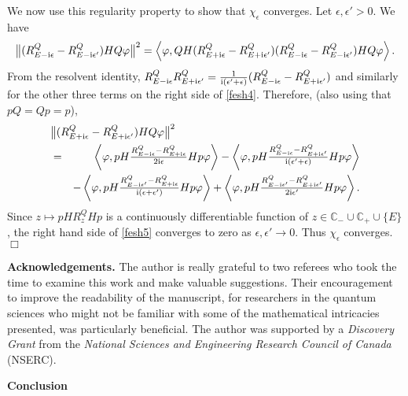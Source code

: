 \documentclass[letterpaper,onecolumn,11pt,accepted=2021-12-09]{quantumarticle}
\numberwithin{equation}{section}
\renewcommand{\i}{{\rm i}}
\def\qed{\hfill $\Box$\medskip}
\newcommand{\scalprod}[2]{\left\langle {#1}, {#2}\right\rangle}
\begin{document}
We now use this regularity property to show that $\chi_\epsilon$ converges. Let $\epsilon, \epsilon'>0$. We have 
\begin{equation}
\big\| (R_{E-\i\epsilon}^Q - R^Q_{E-\i\epsilon'}) HQ\varphi\big\|^2 =\scalprod{\varphi}{ QH(R_{E+\i\epsilon}^Q - R^Q_{E+\i\epsilon'})(R_{E-\i\epsilon}^Q - R^Q_{E-\i\epsilon'})HQ\varphi}.
\label{fesh4}
\end{equation}
From the resolvent identity,  $R^Q_{E-\i\epsilon}R_{E+\i\epsilon'}^Q =  \frac{1}{\i (\epsilon'+\epsilon)} (R^Q_{E-\i\epsilon}-R_{E+\i\epsilon'}^Q)$ and  similarly for the other three terms on the right side of \eqref{fesh4}. Therefore, (also using that $pQ=Qp=p$),  
\begin{eqnarray}
\lefteqn{
\big\| (R_{E+\i\epsilon}^Q - R^Q_{E+\i\epsilon'}) HQ\varphi\big\|^2}\\
&=&
	\scalprod{\varphi}{ pH \tfrac{R^Q_{E-\i\epsilon}-R_{E+\i\epsilon}^Q}{2\i \epsilon} Hp\varphi} - 
	\scalprod{\varphi}{ pH \tfrac{R^Q_{E-\i\epsilon}-R_{E+\i\epsilon'}^Q}{\i(\epsilon'+\epsilon)} Hp\varphi}\nonumber\\
	&& - \scalprod{\varphi}{ pH \tfrac{R^Q_{E-\i\epsilon'}-R_{E+\i\epsilon}^Q}{\i(\epsilon+\epsilon')} Hp\varphi}+\scalprod{\varphi}{ pH \tfrac{R^Q_{E-\i\epsilon'}-R_{E+\i\epsilon'}^Q}{2\i\epsilon'} Hp\varphi}.
	\label{fesh5}
\end{eqnarray}
Since $z\mapsto pH R_z^QHp$ is a continuously differentiable function of $z\in {\mathbb C}_-\cup{\mathbb C}_+\cup \{E\}$, the right hand side of \eqref{fesh5} converges to zero as $\epsilon,\epsilon'\rightarrow 0$. Thus $\chi_\epsilon$ converges. \hfill \qed

\bigskip




{\bf Acknowledgements. } The author is really grateful to two referees who took the time to examine this work and make valuable suggestions. Their encouragement to improve the readability of the manuscript, for researchers in the quantum sciences who might not be familiar with some of the mathematical intricacies presented, was particularly beneficial.  The author was supported by a {\em Discovery Grant} from the {\em National Sciences and Engineering Research Council of Canada } (NSERC).

\bigskip
\bigskip
\medskip


\noindent
{\bf \Large Conclusion}
\bigskip
\end{document}
